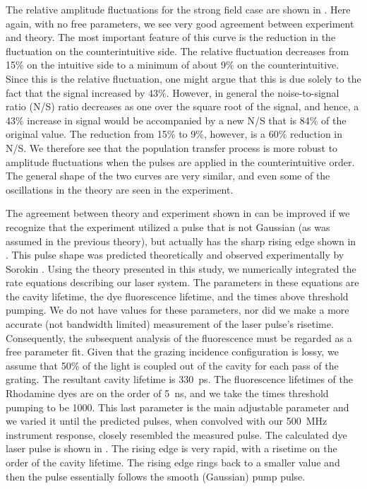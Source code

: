 The relative amplitude fluctuations for the strong field case are shown in
.  Here again, with no free parameters, we see very good
agreement between experiment and theory.  The most important feature of this
curve is the reduction in the fluctuation on the counterintuitive side.  The
relative fluctuation decreases from 15\% on the intuitive side to a minimum of
about 9\% on the counterintuitive.  Since this is the relative fluctuation,
one might argue that this is due solely to the fact that the signal increased
by 43\%.  However, in general the noise-to-signal ratio (N/S) ratio decreases
as one over the square root of the signal, and hence, a 43\%
increase in signal would be accompanied by a new N/S that is
84\% of the original value.  The reduction from 15\% to 9\%, however, is a
60\% reduction in N/S.  We therefore see that the population transfer process
is more robust to amplitude fluctuations when the pulses are applied in the
counterintuitive order.  The general shape of the two curves are very similar,
and even some of the oscillations in the theory are seen in the experiment.

The agreement between theory and experiment shown in  can be
improved if we recognize that the experiment utilized a pulse that is not
Gaussian (as was assumed in the previous theory), but actually has the sharp
rising edge shown in .  This pulse shape was predicted
theoretically and observed experimentally by Sorokin \etal \cite{Sorokin:67}. 
Using the theory presented in this study, we numerically integrated the
rate equations describing our laser system.  The parameters in these equations
are the cavity lifetime, the dye fluorescence lifetime, and the times above
threshold pumping.  We do not have values for these parameters, nor did we
make a more accurate (not bandwidth limited) measurement of the laser pulse's
risetime.  Consequently, the subsequent analysis of the fluorescence must be
regarded as a free parameter fit.  Given that the grazing incidence
configuration is lossy, we assume that 50\% of the light is coupled out of the
cavity for each pass of the grating.  The resultant cavity lifetime is 330~ps.
The fluorescence lifetimes of the Rhodamine dyes are on the order of 5~ns, and
we take the times threshold pumping to be 1000.  This last parameter is the main
adjustable parameter and we varied it until the predicted pulses, when convolved
with our 500~MHz instrument response, closely resembled the measured pulse.  The
calculated dye laser pulse is shown in .  The rising edge is very
rapid, with a risetime on the order of the cavity lifetime.  The rising edge
rings back to a smaller value and then the pulse essentially follows the smooth
(Gaussian) pump pulse.

